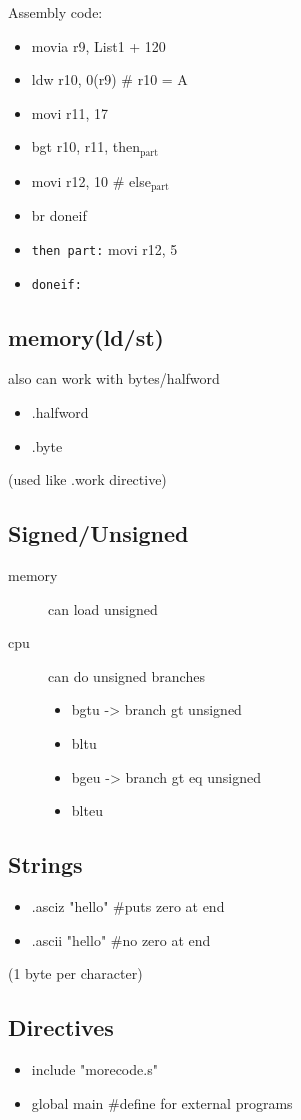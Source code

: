 \documentclass[11pt]{article}
\begin{document}
Assembly code:
\begin{itemize}
\item movia r9, List1 + 120
\item ldw r10, 0(r9) \# r10 = A
\item movi r11, 17
\item bgt r10, r11, then\(_{\text{part}}\)
\item movi r12, 10 \# else\(_{\text{part}}\)
\item br doneif
\item \texttt{then part:} movi r12, 5
\item \texttt{doneif:}
\end{itemize}
\subsection{memory(ld/st)}
\label{sec:orgheadline18}
also can work with bytes/halfword
\begin{itemize}
\item .halfword
\item .byte
\end{itemize}
(used like .work directive)
\subsection{Signed/Unsigned}
\label{sec:orgheadline19}
\begin{description}
\item[{memory}] can load unsigned
\item[{cpu}] can do unsigned branches
\begin{itemize}
\item bgtu -> branch gt unsigned
\item bltu
\item bgeu -> branch gt eq unsigned
\item blteu
\end{itemize}
\end{description}
\subsection{Strings}
\label{sec:orgheadline20}
\begin{itemize}
\item .asciz "hello" \#puts zero at end
\item .ascii "hello" \#no zero at end
\end{itemize}
(1 byte per character)
\subsection{Directives}
\label{sec:orgheadline21}
\begin{itemize}
\item include "morecode.s"
\item global main \#define for external programs
\end{itemize}
\end{document}
